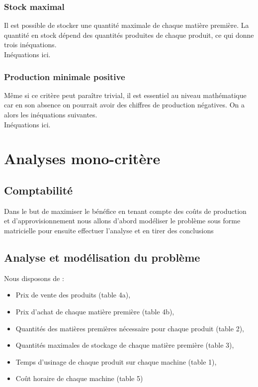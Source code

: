 \documentclass{article}
\begin{document}
\subsubsection{Stock maximal}
Il est possible de stocker une quantité maximale de chaque matière première. La quantité en stock dépend des quantités produites de chaque produit, ce qui donne trois inéquations.\\

Inéquations ici.

\subsubsection{Production minimale positive}
Même si ce critère peut paraître trivial, il est essentiel au niveau mathématique car en son absence on pourrait avoir des chiffres de production négatives. On a alors les inéquations suivantes.\\

Inéquations ici.


\section{Analyses mono-critère}
\subsection{Comptabilité}

Dans le but de maximiser le bénéfice en tenant compte des coûts de production et d’approvisionnement nous allons d'abord modéliser le problème sous forme matricielle pour ensuite effectuer l'analyse et en tirer des conclusions \\

\subsection{Analyse et modélisation du problème}
Nous disposons de : \\

\begin{itemize}
\item Prix de vente des produits (table 4a),
\item Prix d’achat de chaque matière première (table 4b),
\item Quantités des matières premières nécessaire pour chaque produit (table 2),
\item Quantités maximales de stockage de chaque matière première (table 3),
\item Temps d’usinage de chaque produit sur chaque machine (table 1),
\item Coût horaire de chaque machine (table 5)
\end{itemize}
\end{document}
